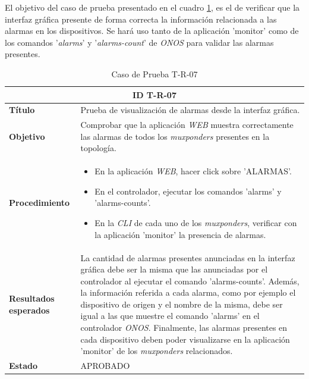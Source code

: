El objetivo del caso de prueba presentado en el cuadro \ref{tab:TR07}, es el de verificar que la interfaz gráfica presente de forma correcta la información relacionada a las alarmas en los dispositivos. 
Se hará uso tanto de la aplicación 'monitor' como de los comandos '\textit{alarms}' y '\textit{alarms-count}' de \textit{ONOS} para validar las alarmas presentes.


\begin{table}[H]
  \centering
  \begin{tabular}{ |m{2.5cm}|m{11cm}|  }
  \hline
  \multicolumn{2}{|c|}{ \textbf{ID T-R-07} } \\
  \hline
  \centering
  \textbf{Título} & Prueba de visualización de alarmas desde la interfaz gráfica.  \\
  \hline
  \centering
  \textbf{Objetivo} & Comprobar que la aplicación \textit{WEB} muestra correctamente las alarmas de todos los \textit{muxponders} presentes en la topología.   \\
  \hline
  \centering
  \textbf{Procedimiento} & \begin{itemize}
    \item En la aplicación \textit{WEB}, hacer click sobre 'ALARMAS'.
    \item En el controlador, ejecutar los comandos 'alarms' y 'alarms-counts'. 
    \item En la \textit{CLI} de cada uno de los \textit{muxponders}, verificar con la aplicación 'monitor' la presencia de alarmas.
  \end{itemize}     \\
  \hline
  \centering
  \textbf{Resultados esperados} & 
  La cantidad de alarmas presentes anunciadas en la interfaz gráfica debe ser la misma que las anunciadas por el controlador al ejecutar el comando 'alarms-counts'.
Además, la información referida a cada alarma, como por ejemplo el dispositivo de origen y el nombre de la misma, debe ser igual a las que muestre el comando 'alarms' en el controlador \textit{ONOS}.
Finalmente, las alarmas presentes en cada dispositivo deben poder visualizarse en la aplicación 'monitor' de los \textit{muxponders} relacionados. 
    \\
  
    \hline
  \centering
    \textbf{Estado}    & APROBADO  \\
  \hline
  \end{tabular}
  
  \caption{Caso de Prueba T-R-07}
  \label{tab:TR07}
  \end{table}

